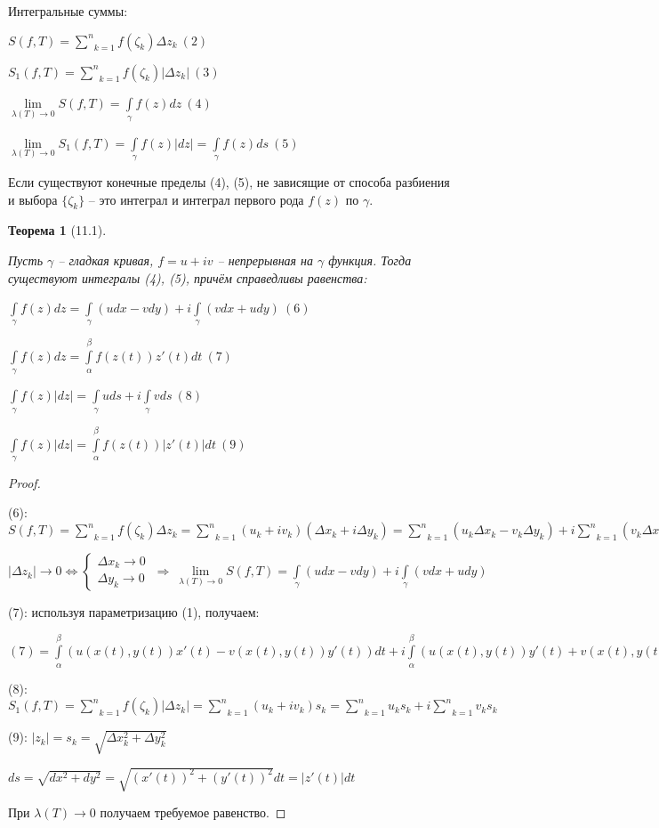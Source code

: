 \documentclass[final]{report}
\newcommand{\forcenewline}{$\phantom{\mbox{newline}}$\newline}
\newcommand{\then}{\ \Rightarrow\ }
\newcommand{\mint}[2]{\underset{#1}{\overset{#2}{\int}}}
\newcommand{\msum}[2]{\underset{#1}{\overset{#2}{\sum}}}
\newcommand{\mlim}[1]{\underset{#1}{\lim}}
\newcommand{\LRA}{\Leftrightarrow}
\renewcommand{\a}{\alpha}
\renewcommand{\b}{\beta}
\newcommand{\g}{\gamma}
\renewcommand{\l}{\lambda}
\newcommand{\D}{\Delta}
\newcommand{\sys}[1]{\left\{\begin{matrix}#1\end{matrix}\right.}
\newtheorem*{theor}{Теорема}
\theoremstyle{remark}
\begin{document}
Интегральные суммы:

$S(f,T)=\msum{k=1}{n}f(\zeta_k)\D z_k\ (2)$

$S_1(f,T)=\msum{k=1}{n}f(\zeta_k)|\D z_k|\ (3)$

$\mlim{\l(T)\to 0}S(f,T)=\mint{\g}{} f(z)dz\ (4)$

$\mlim{\l(T)\to 0}S_1(f,T)=\mint{\g}{} f(z)|dz|=\mint{\g}{} f(z)ds\ (5)$

Если существуют конечные пределы (4), (5), не зависящие от способа разбиения и выбора $\{\zeta_k\}$ -- это интеграл и интеграл первого рода $f(z)$ по $\g$.

\begin{theor}[11.1]
\forcenewline

Пусть $\g$ -- гладкая кривая, $f=u+iv$ -- непрерывная на $\g$ функция. Тогда существуют интегралы (4), (5), причём справедливы равенства:

$\mint{\g}{}f(z)dz=\mint{\g}{}(udx-vdy)+i\mint{\g}{}(vdx+udy)\ (6)$

$\mint{\g}{}f(z)dz=\mint{\a}{\b}f(z(t))z'(t)dt\ (7)$

$\mint{\g}{}f(z)|dz|=\mint{\g}{}uds+i\mint{\g}{}vds\ (8)$

$\mint{\g}{}f(z)|dz|=\mint{\a}{\b}f(z(t))|z'(t)|dt\ (9)$
\end{theor}
\begin{proof}
\forcenewline

(6): $S(f,T)=\msum{k=1}{n}f(\zeta_k)\D z_k=\msum{k=1}{n}(u_k+iv_k)(\D x_k+i\D y_k)=\msum{k=1}{n}(u_k\D x_k-v_k\D y_k)+i\msum{k=1}{n}(v_k\D x_k+u_k\D y_k)$

$|\D z_k|\to 0 \LRA\sys{\D x_k\to 0 \\ \D y_k\to 0}\then \mlim{\l(T)\to 0}S(f,T)=\mint{\g}{}(udx-vdy)+i\mint{\g}{}(vdx+udy)$

(7): используя параметризацию (1), получаем:

$(7)=\mint\a\b(u(x(t),y(t))x'(t)-v(x(t),y(t))y'(t))dt+i\mint\a\b(u(x(t),y(t))y'(t)+v(x(t),y(t))x'(t))dt=\mint\a\b(u+iv)(x'+iy')=\mint\a\b f(z(t))z'(t)dt$

(8): $S_1(f,T)=\msum{k=1}{n}f(\zeta_k)|\D z_k|=\msum{k=1}{n}(u_k+iv_k)s_k=\msum{k=1}{n}u_ks_k+i\msum{k=1}{n}v_ks_k$

(9): $|z_k|=s_k=\sqrt{\D x_k^2+\D y_k^2}$

$ds=\sqrt{dx^2+dy^2}=\sqrt{(x'(t))^2+(y'(t))^2}dt=|z'(t)|dt$

При $\l(T)\to 0$ получаем требуемое равенство.
\end{proof}
\end{document}
